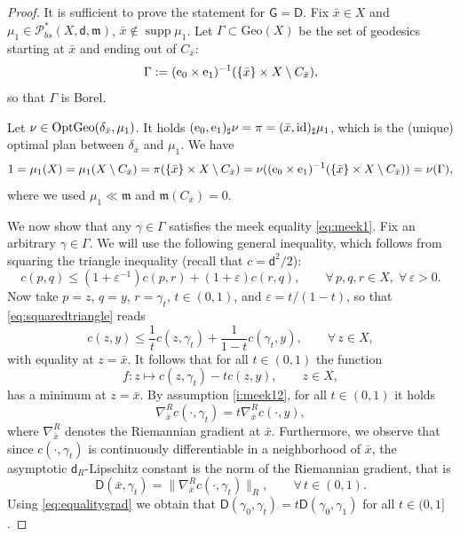 \documentclass[11pt,a4paper]{article}
\theoremstyle{plain}
\theoremstyle{definition}
\theoremstyle{remark}
\numberwithin{equation}{section}
\DeclareMathOperator{\supp}{\mathrm{supp}}
\newcommand{\Geo}{\mathrm{Geo}}
\newcommand{\OptGeo}{{\rm OptGeo}}
\newcommand{\mm}{\mathfrak m}
\newcommand{\ee}{{\rm e}}
\newcommand{\sfd}{\mathsf d}
\newcommand{\sfD}{\mathsf D}
\newcommand{\sfG}{\mathsf G}
\begin{document}
\begin{proof}
It is sufficient to prove the statement for $\sfG=\sfD$. Fix $\bar{x}\in X$ and $\mu_1\in \mathcal{P}_{bs}^*(X,\sfd,\mm)$, $\bar{x}\notin \supp\mu_1$. Let $\Gamma\subset \Geo(X)$ be the set of geodesics starting at $\bar{x}$ and ending out of $C_{\bar{x}}$:
\begin{equation}
\Gamma := (\ee_0\times \ee_1)^{-1}(\{\bar{x}\}\times X\setminus C_{\bar{x}}),
\end{equation}
so that $\Gamma$ is Borel.

Let $\nu \in \OptGeo(\delta_{\bar{x}},\mu_1)$. It holds $(\ee_0,\ee_1)_\sharp \nu = \pi = (\bar{x}, {\rm id})_\sharp \mu_1$, which is the (unique)  optimal plan between $\delta_{\bar{x}}$ and $\mu_1$. We have
\begin{equation}
1 = \mu_1(X) = \mu_1(X\setminus C_{\bar{x}}) = \pi(\{\bar{x}\}\times X\setminus C_{\bar{x}})= \nu((\ee_0\times \ee_1)^{-1}(\{\bar{x}\}\times X\setminus C_{\bar{x}})) = \nu(\Gamma),
\end{equation}
where we used $\mu_1\ll \mm$ and $\mm(C_{\bar{x}})=0$.

We now show that any $\gamma\in\Gamma$ satisfies the meek equality \eqref{eq:meek1}. Fix an arbitrary $\gamma \in \Gamma$. We will use the following general inequality, which follows from squaring the triangle inequality (recall that $c=\sfd^2/2$):
\begin{equation}\label{eq:squaredtriangle}
c(p,q) \leq (1+\varepsilon^{-1})c(p,r) + (1+\varepsilon)c(r,q), \qquad \forall\, p,q,r\in X,\; \forall\, \varepsilon>0.
\end{equation}
Now take $p=z$, $q=y$, $r=\gamma_t$, $t\in (0,1)$, and $\varepsilon=t/(1-t)$, so that \eqref{eq:squaredtriangle} reads
\begin{equation}
c(z,y) \leq \frac{1}{t}c(z,\gamma_t) + \frac{1}{1-t}c(\gamma_t,y), \qquad\forall\, z\in X,
\end{equation}
with equality at $z=\bar{x}$. It follows that for all $t\in (0,1)$ the function
\begin{equation}
f: z\mapsto c(z,\gamma_t)-tc(z,y),\qquad z\in X,
\end{equation}
has a minimum at $z=\bar{x}$. By assumption \ref{i:meek12}, for all $t\in (0,1)$ it holds
\begin{equation}\label{eq:equalitygrad}
\nabla_{\bar{x}}^R c(\cdot,\gamma_t) = t \nabla_{\bar{x}}^R c(\cdot,y),
\end{equation}
where $\nabla^R_{\bar{x}}$ denotes the Riemannian gradient at $\bar{x}$. Furthermore, we observe that since $c(\cdot,\gamma_t)$ is continuously differentiable in a neighborhood of $\bar{x}$, the asymptotic $\sfd_R$-Lipschitz constant is the norm of the Riemannian gradient, that is
\begin{equation}
\sfD(\bar{x},\gamma_t) = \|\nabla^R_{\bar{x}} c(\cdot,\gamma_t)\|_R, \qquad \forall\, t\in (0,1).
\end{equation}
Using \eqref{eq:equalitygrad} we obtain that $\sfD(\gamma_0,\gamma_t) = t \sfD(\gamma_0,\gamma_1)$ for all $t\in (0,1]$. 
\end{proof}
\end{document}
